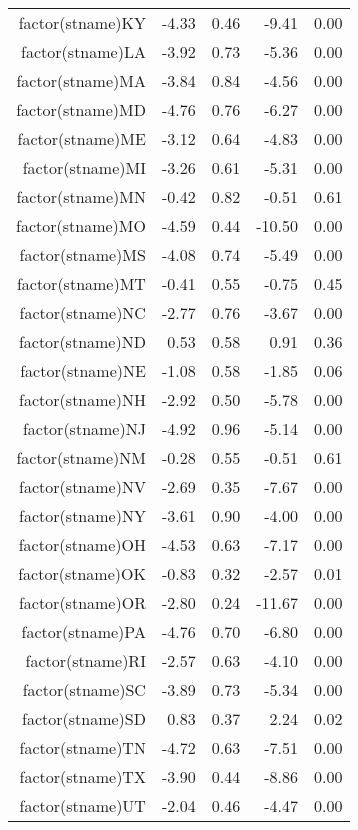 \begin{table}[ht]
\begin{tabular}{rrrrr}
  factor(stname)KY & -4.33 & 0.46 & -9.41 & 0.00 \\ 
  factor(stname)LA & -3.92 & 0.73 & -5.36 & 0.00 \\ 
  factor(stname)MA & -3.84 & 0.84 & -4.56 & 0.00 \\ 
  factor(stname)MD & -4.76 & 0.76 & -6.27 & 0.00 \\ 
  factor(stname)ME & -3.12 & 0.64 & -4.83 & 0.00 \\ 
  factor(stname)MI & -3.26 & 0.61 & -5.31 & 0.00 \\ 
  factor(stname)MN & -0.42 & 0.82 & -0.51 & 0.61 \\ 
  factor(stname)MO & -4.59 & 0.44 & -10.50 & 0.00 \\ 
  factor(stname)MS & -4.08 & 0.74 & -5.49 & 0.00 \\ 
  factor(stname)MT & -0.41 & 0.55 & -0.75 & 0.45 \\ 
  factor(stname)NC & -2.77 & 0.76 & -3.67 & 0.00 \\ 
  factor(stname)ND & 0.53 & 0.58 & 0.91 & 0.36 \\ 
  factor(stname)NE & -1.08 & 0.58 & -1.85 & 0.06 \\ 
  factor(stname)NH & -2.92 & 0.50 & -5.78 & 0.00 \\ 
  factor(stname)NJ & -4.92 & 0.96 & -5.14 & 0.00 \\ 
  factor(stname)NM & -0.28 & 0.55 & -0.51 & 0.61 \\ 
  factor(stname)NV & -2.69 & 0.35 & -7.67 & 0.00 \\ 
  factor(stname)NY & -3.61 & 0.90 & -4.00 & 0.00 \\ 
  factor(stname)OH & -4.53 & 0.63 & -7.17 & 0.00 \\ 
  factor(stname)OK & -0.83 & 0.32 & -2.57 & 0.01 \\ 
  factor(stname)OR & -2.80 & 0.24 & -11.67 & 0.00 \\ 
  factor(stname)PA & -4.76 & 0.70 & -6.80 & 0.00 \\ 
  factor(stname)RI & -2.57 & 0.63 & -4.10 & 0.00 \\ 
  factor(stname)SC & -3.89 & 0.73 & -5.34 & 0.00 \\ 
  factor(stname)SD & 0.83 & 0.37 & 2.24 & 0.02 \\ 
  factor(stname)TN & -4.72 & 0.63 & -7.51 & 0.00 \\ 
  factor(stname)TX & -3.90 & 0.44 & -8.86 & 0.00 \\ 
  factor(stname)UT & -2.04 & 0.46 & -4.47 & 0.00 \\ 

\end{tabular}
\end{table}
